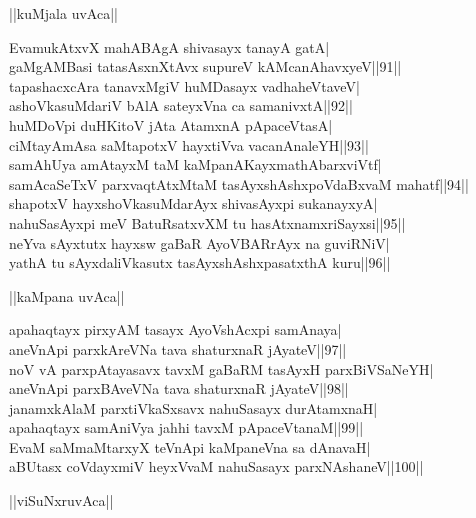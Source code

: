 \documentclass{article}
\begin{document}
\begin{center}
||kuMjala uvAca||
\end{center}

EvamukAtxvX mahABAgA shivasayx tanayA gatA|\\
gaMgAMBasi tatasAsxnXtAvx supureV kAMcanAhavxyeV||91||\\
tapashacxcAra tanavxMgiV huMDasayx vadhaheVtaveV|\\
ashoVkasuMdariV bAlA sateyxVna ca samanivxtA||92||\\
huMDoVpi duHKitoV jAta AtamxnA pApaceVtasA|\\
ciMtayAmAsa saMtapotxV hayxtiVva vacanAnaleYH||93||\\
samAhUya amAtayxM taM kaMpanAKayxmathAbarxviVtf|\\
samAcaSeTxV parxvaqtAtxMtaM tasAyxshAshxpoVdaBxvaM mahatf||94||\\
shapotxV hayxshoVkasuMdarAyx shivasAyxpi sukanayxyA|\\
nahuSasAyxpi meV BatuRsatxvXM tu hasAtxnamxriSayxsi||95||\\
neYva sAyxtutx hayxsw gaBaR AyoVBARrAyx na guviRNiV|\\
yathA tu sAyxdaliVkasutx tasAyxshAshxpasatxthA kuru||96||\\

\begin{center}
||kaMpana uvAca||
\end{center}

apahaqtayx pirxyAM tasayx AyoVshAcxpi samAnaya|\\
aneVnApi parxkAreVNa tava shaturxnaR jAyateV||97||\\
noV vA parxpAtayasavx tavxM gaBaRM tasAyxH parxBiVSaNeYH|\\
aneVnApi parxBAveVNa tava shaturxnaR jAyateV||98||\\
janamxkAlaM parxtiVkaSxsavx nahuSasayx durAtamxnaH|\\
apahaqtayx samAniVya jahhi tavxM pApaceVtanaM||99||\\
EvaM saMmaMtarxyX teVnApi kaMpaneVna sa dAnavaH|\\
aBUtasx coVdayxmiV heyxVvaM nahuSasayx parxNAshaneV||100||\\

\begin{center}
||viSuNxruvAca||
\end{center}
\end{document}
